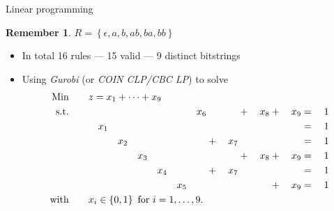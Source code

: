 \documentclass[icelandic]{beamer}
\newtheorem*{remember}{Remember}
\newtheorem*{research questions}{Research questions}
\begin{document}
\begin{frame}{Linear programming}
  \begin{remember}
    $R = \left \{ \epsilon, a, b, ab, ba, bb \right \}$
  \end{remember}
  \begin{itemize}[<+->]
    \item In total 16 rules --- 15 valid --- 9 distinct bitstrings
    \item Using \emph{Gurobi} (or \emph{COIN CLP/CBC LP}) to solve 
        \begin{alignat*}{17}
          \text{Min}    \qquad  & \mathrlap{z = x_1 + \cdots + x_9} & & & & & & & & & & & & & & & \\
          \text{s.t.}   \qquad  & &     &     &     &     &     &     &     &     &     &     & x_6 &     &     & +{} & x_8 & +{} & x_9 & ={}  &  1 \\
                                & & x_1 &     &     &     &     &     &     &     &     &     &     &     &     &     &     &     &     & ={}  &  1 \\
                                & &     &     & x_2 &     &     &     &     &     &     &     &     & +{} & x_7 &     &     &     &     & ={}  &  1 \\
                                & &     &     &     &     & x_3 &     &     &     &     &     &     &     &     & +{} & x_8 & +{} & x_9 & ={}  &  1 \\
                                & &     &     &     &     &     &     & x_4 &     &     &     &     & +{} & x_7 &     &     &     &     & ={}  &  1 \\
                                & &     &     &     &     &     &     &     &     & x_5 &     &     &     &     &     &     & +{} & x_9 & ={}  &  1 \\
          \text{with}   \qquad  & \mathrlap{x_i \in \left\{ 0, 1 \right\} \text{ for } i = 1, \ldots, 9.} & & & & & & & & & & & & & & &
      \end{alignat*}
  \end{itemize}
\end{frame}
\end{document}
